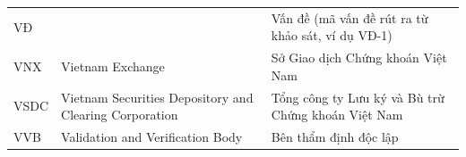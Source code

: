 \documentclass[a4paper,oneside]{report}
\numberwithin{equation}{chapter}
\begin{document}
\begin{longtable}{@{}p{2.4cm}p{5.4cm}p{6.3cm}@{}}
VĐ     &                                           & Vấn đề (mã vấn đề rút ra từ khảo sát, ví dụ VĐ-1) \\
VNX    & Vietnam Exchange                          & Sở Giao dịch Chứng khoán Việt Nam \\
VSDC   & Vietnam Securities Depository and Clearing Corporation & Tổng công ty Lưu ký và Bù trừ Chứng khoán Việt Nam \\
VVB    & Validation and Verification Body          & Bên thẩm định độc lập \\
\end{longtable}

\clearpage
{}



% 

% 

% 

% 

%
%
\end{document}
